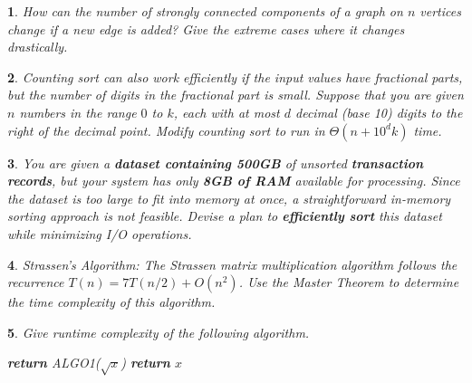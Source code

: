 \documentclass[%
addpoints]{exam}
\theoremstyle{problem}
\newtheorem{p}{}
\begin{document}
\begin{p} 
    How can the number of strongly connected components of a graph on $n$ vertices change if a new edge is added? Give the extreme cases where it changes 
    drastically.
\hfill  
\end{p}
    

\begin{p} 
    Counting sort can also work efficiently if the input values have fractional parts, but the number of digits in the fractional part is small. Suppose that you are given \( n \) numbers in the range \( 0 \) to \( k \), each with at most \( d \) decimal (base 10) digits to the right of the decimal point. Modify counting sort to run in \( \Theta(n + 10^d k) \) time.  
\hfill  
\end{p}


\begin{p}
    You are given a \textbf{dataset containing 500GB} of unsorted \textbf{transaction records}, but your system has only \textbf{8GB of RAM} available for processing. Since the dataset is too large to fit into memory at once, a straightforward in-memory sorting approach is not feasible. Devise a plan to \textbf{efficiently sort} this dataset while minimizing I/O operations.
\hfill
\end{p}


\begin{p}
    Strassen's Algorithm: The Strassen matrix multiplication algorithm follows the recurrence \(T(n) = 7T(n/2) + O(n^2)\). Use the Master Theorem to determine the time complexity of this algorithm.  
\hfill
\end{p}

\begin{p}
    Give runtime complexity of the following algorithm.
    \begin{algorithm}[!h]
        \label{algo1}
        \begin{algorithmic}
             
            \State \textbf{return} ALGO1($\sqrt{x}$)
            \Else
            \State \textbf{return} $x$
            \EndIf
            \EndProcedure
        \end{algorithmic}
    \end{algorithm}
\hfill 
\end{p}
\end{document}
